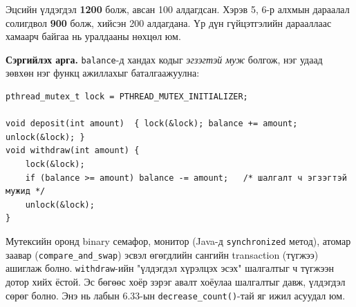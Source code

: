 \documentclass[12pt,a4paper]{article}
\begin{document}
Эцсийн үлдэгдэл \textbf{1200} болж, авсан 100 алдагдсан. Хэрэв 5, 6-р алхмын дараалал солигдвол \textbf{900} болж, хийсэн 200 алдагдана. Үр дүн гүйцэтгэлийн дарааллаас хамаарч байгаа нь уралдааны нөхцөл юм.

\textbf{Сэргийлэх арга.} \texttt{balance}-д хандах кодыг \emph{эгзэгтэй муж} болгож, нэг удаад зөвхөн нэг функц ажиллахыг баталгаажуулна:
\begin{lstlisting}
pthread_mutex_t lock = PTHREAD_MUTEX_INITIALIZER;

void deposit(int amount)  { lock(&lock); balance += amount; unlock(&lock); }
void withdraw(int amount) {
    lock(&lock);
    if (balance >= amount) balance -= amount;   /* шалгалт ч эгзэгтэй мужид */
    unlock(&lock);
}
\end{lstlisting}
Мутексийн оронд binary семафор, монитор (Java-д \texttt{synchronized} метод), атомар заавар (\texttt{compare\_and\_swap}) эсвэл өгөгдлийн сангийн transaction (түгжээ) ашиглаж болно. \texttt{withdraw}-ийн "үлдэгдэл хүрэлцэх эсэх" шалгалтыг ч түгжээн дотор хийх ёстой. Эс бөгөөс хоёр зэрэг авалт хоёулаа шалгалтыг давж, үлдэгдэл сөрөг болно. Энэ нь лабын 6.33-ын \texttt{decrease\_count()}-тай яг ижил асуудал юм.
\end{document}
